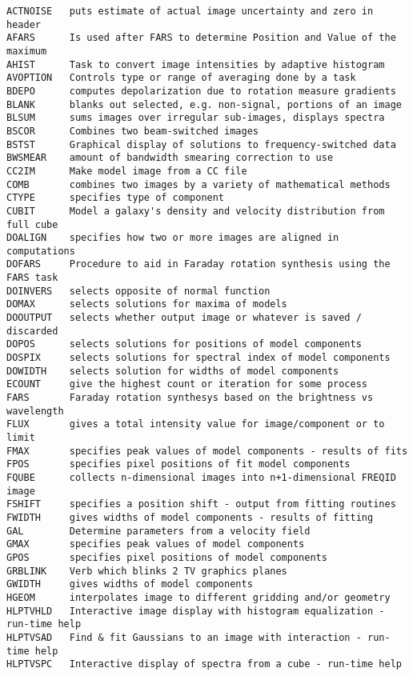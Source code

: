 \vskip 0.5pt
\bbve\begin{verbatim}
ACTNOISE   puts estimate of actual image uncertainty and zero in header
AFARS      Is used after FARS to determine Position and Value of the maximum
AHIST      Task to convert image intensities by adaptive histogram
AVOPTION   Controls type or range of averaging done by a task
BDEPO      computes depolarization due to rotation measure gradients
BLANK      blanks out selected, e.g. non-signal, portions of an image
BLSUM      sums images over irregular sub-images, displays spectra
BSCOR      Combines two beam-switched images
BSTST      Graphical display of solutions to frequency-switched data
BWSMEAR    amount of bandwidth smearing correction to use
CC2IM      Make model image from a CC file
COMB       combines two images by a variety of mathematical methods
CTYPE      specifies type of component
CUBIT      Model a galaxy's density and velocity distribution from full cube
DOALIGN    specifies how two or more images are aligned in computations
DOFARS     Procedure to aid in Faraday rotation synthesis using the FARS task
DOINVERS   selects opposite of normal function
DOMAX      selects solutions for maxima of models
DOOUTPUT   selects whether output image or whatever is saved / discarded
DOPOS      selects solutions for positions of model components
DOSPIX     selects solutions for spectral index of model components
DOWIDTH    selects solution for widths of model components
ECOUNT     give the highest count or iteration for some process
FARS       Faraday rotation synthesys based on the brightness vs wavelength
FLUX       gives a total intensity value for image/component or to limit
FMAX       specifies peak values of model components - results of fits
FPOS       specifies pixel positions of fit model components
FQUBE      collects n-dimensional images into n+1-dimensional FREQID image
FSHIFT     specifies a position shift - output from fitting routines
FWIDTH     gives widths of model components - results of fitting
GAL        Determine parameters from a velocity field
GMAX       specifies peak values of model components
GPOS       specifies pixel positions of model components
GRBLINK    Verb which blinks 2 TV graphics planes
GWIDTH     gives widths of model components
HGEOM      interpolates image to different gridding and/or geometry
HLPTVHLD   Interactive image display with histogram equalization - run-time help
HLPTVSAD   Find & fit Gaussians to an image with interaction - run-time help
HLPTVSPC   Interactive display of spectra from a cube - run-time help

\end{verbatim}
